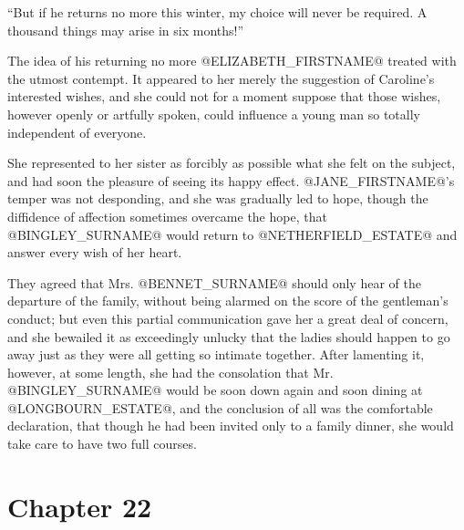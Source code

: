 ``But if he returns no more this winter, my choice will never be
required. A thousand things may arise in six months!''

The idea of his returning no more @ELIZABETH_FIRSTNAME@ treated with the utmost
contempt. It appeared to her merely the suggestion of Caroline's
interested wishes, and she could not for a moment suppose that those
wishes, however openly or artfully spoken, could influence a young man
so totally independent of everyone.

She represented to her sister as forcibly as possible what she felt
on the subject, and had soon the pleasure of seeing its happy effect.
@JANE_FIRSTNAME@'s temper was not desponding, and she was gradually led to hope,
though the diffidence of affection sometimes overcame the hope, that
@BINGLEY_SURNAME@ would return to @NETHERFIELD_ESTATE@ and answer every wish of her heart.

They agreed that Mrs. @BENNET_SURNAME@ should only hear of the departure of the
family, without being alarmed on the score of the gentleman's conduct;
but even this partial communication gave her a great deal of concern,
and she bewailed it as exceedingly unlucky that the ladies should happen
to go away just as they were all getting so intimate together. After
lamenting it, however, at some length, she had the consolation that Mr.
@BINGLEY_SURNAME@ would be soon down again and soon dining at @LONGBOURN_ESTATE@, and the
conclusion of all was the comfortable declaration, that though he had
been invited only to a family dinner, she would take care to have two
full courses.



\chapter*{Chapter 22}



